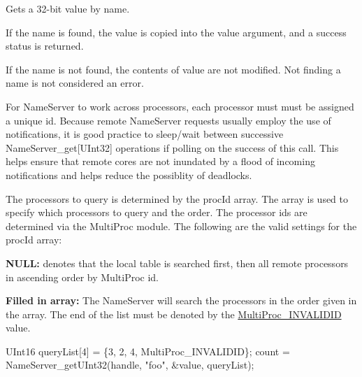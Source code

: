 Gets a 32-\/bit value by name. 

If the name is found, the value is copied into the value argument, and a success status is returned.

If the name is not found, the contents of value are not modified. Not finding a name is not considered an error.

For Name\-Server to work across processors, each processor must must be assigned a unique id. Because remote Name\-Server requests usually employ the use of notifications, it is good practice to sleep/wait between successive Name\-Server\-\_\-get\mbox{[}U\-Int32\mbox{]} operations if polling on the success of this call. This helps ensure that remote cores are not inundated by a flood of incoming notifications and helps reduce the possiblity of deadlocks.

The processors to query is determined by the proc\-Id array. The array is used to specify which processors to query and the order. The processor ids are determined via the Multi\-Proc module. The following are the valid settings for the proc\-Id array\-: \begin{DoxyItemize}
\item {\bfseries N\-U\-L\-L\-:} denotes that the local table is searched first, then all remote processors in ascending order by Multi\-Proc id. \item {\bfseries Filled in array\-:} The Name\-Server will search the processors in the order given in the array. The end of the list must be denoted by the \hyperlink{_multi_proc_8h_a94a1d14527833bc8294407634d5495d9}{Multi\-Proc\-\_\-\-I\-N\-V\-A\-L\-I\-D\-I\-D} value.\end{DoxyItemize}

\begin{DoxyCode}
    UInt16 queryList[4] = \{3, 2, 4, MultiProc_INVALIDID\};
    count = NameServer_getUInt32(handle, \textcolor{stringliteral}{"foo"}, &value, queryList);
\end{DoxyCode}


